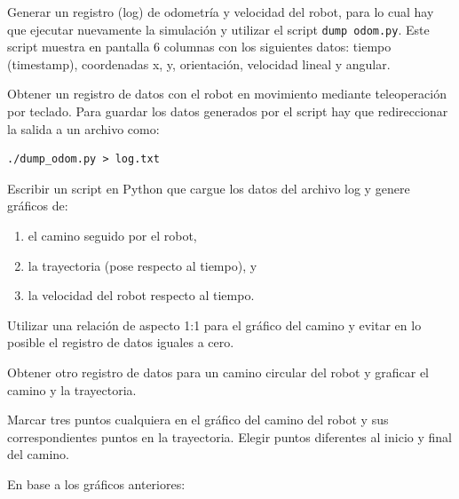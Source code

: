 \documentclass[tp]{lcc}
\begin{document}
\ejercicio Generar un registro (log) de odometría y velocidad del robot, para lo cual hay que ejecutar nuevamente la simulación y utilizar el script \lstinline[style=bash]{dump odom.py}. Este script muestra en pantalla 6 columnas con los siguientes datos: tiempo (timestamp), coordenadas x, y, orientación, velocidad lineal y angular.

\ejercicio Obtener un registro de datos con el robot en movimiento mediante teleoperación por teclado. Para guardar los datos generados por el script hay que redireccionar la salida a un archivo como:

\begin{lstlisting}[style=bash] 
./dump_odom.py > log.txt
\end{lstlisting}

\ejercicio Escribir un script en Python que cargue los datos del archivo log y genere gráficos de:
\begin{enumerate}
	\item el camino seguido por el robot,
	\item la trayectoria (pose respecto al tiempo), y
	\item la velocidad del robot respecto al tiempo.
\end{enumerate} 

\begin{nota}
	Utilizar una relación de aspecto 1:1 para el gráfico del camino y evitar en lo posible el registro de datos iguales a cero.
\end{nota}

\ejercicio Obtener otro registro de datos para un camino circular del robot y graficar el camino y la trayectoria.

\ejercicio Marcar tres puntos cualquiera en el gráfico del camino del robot y sus correspondientes puntos en la trayectoria. Elegir puntos diferentes al inicio y final del camino.


En base a los gráficos anteriores:
\end{document}
